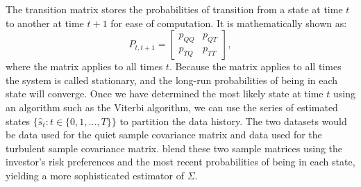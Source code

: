 \documentclass[
]{article}
\begin{document}
The transition matrix stores the probabilities of transition from a state at time \(t\) to another at
time \(t + 1\) for ease of computation. It is mathematically shown as:
\[P_{t, t + 1} = \begin{bmatrix} 
p_{QQ} & p_{QT} \\
p_{TQ} & p_{TT}  
\end{bmatrix},\]
where the matrix applies to all times \(t\). Because the matrix applies to all times the system is called
stationary, and the long-run probabilities of being in each state will converge. Once we have
determined the most likely state at time \(t\) using an algorithm such as the Viterbi algorithm, we can
use the series of estimated states \(\{\hat{s}_t: t \in \{0, 1, ..., T\}\}\) to partition the
data history. The two datasets would be data used for the quiet sample covariance matrix and data used
for the turbulent sample covariance matrix. \citet{FD18} blend these two sample matrices using the investor's
risk preferences and the most recent probabilities of being in each state, yielding a more
sophisticated estimator of \(\Sigma\).
\end{document}
